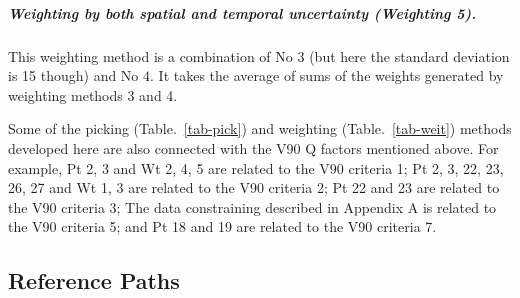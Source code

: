 \subparagraph{Weighting by both spatial and temporal uncertainty (Weighting 5).}
This weighting method is a combination of No $3$ (but here the standard
deviation is 15 though) and No $4$. It takes the average of sums of the weights
generated by weighting methods 3 and 4.

Some of the picking (Table.~\ref{tab-pick}) and weighting
(Table.~\ref{tab-weit}) methods developed here are also connected with the V90 Q
factors mentioned above. For example, Pt 2, 3 and Wt 2, 4, 5 are related to the
V90 criteria 1; Pt 2, 3, 22, 23, 26, 27 and Wt 1, 3 are related to the V90
criteria 2; Pt 22 and 23 are related to the V90 criteria 3; The data
constraining described in Appendix A is related to the V90 criteria 5; and Pt 18
and 19 are related to the V90 criteria 7.

\subsection{Reference Paths}

